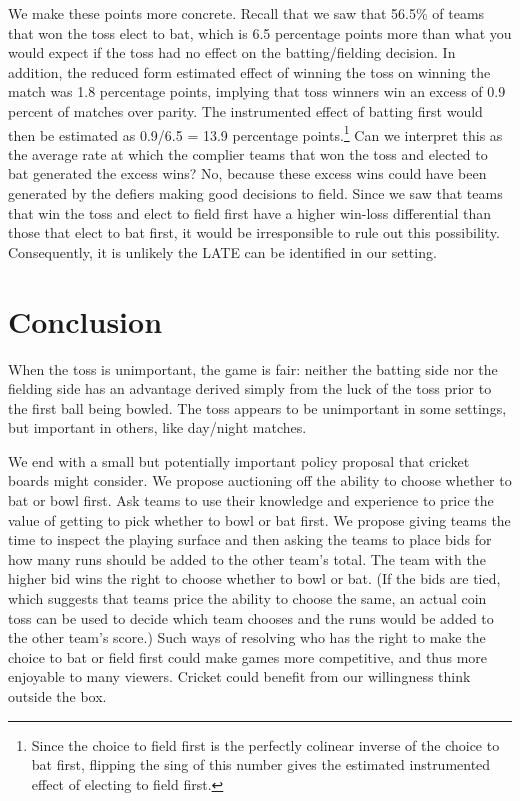 \documentclass[11pt,  letterpaper]{article}
\begin{document}
We make these points more concrete. Recall that we saw that 56.5\% of teams that won the toss elect to bat, which is 6.5 percentage points more than what you would expect if the toss had no effect on the batting/fielding decision. In addition, the reduced form estimated effect of winning the toss on winning the match was 1.8 percentage points, implying that toss winners win an excess of 0.9 percent of matches over parity. The instrumented effect of batting first would then be estimated as 0.9/6.5 = 13.9 percentage points.\footnote{Since the choice to field first is the perfectly colinear inverse of the choice to bat first, flipping the sing of this number gives the estimated instrumented effect of electing to field first.} Can we interpret this as the average rate at which the complier teams that won the toss and elected to bat generated the excess wins? No, because these excess wins could have been generated by the defiers making good decisions to field. Since we saw that teams that win the toss and elect to field first have a higher win-loss differential than those that elect to bat first, it would be irresponsible to rule out this possibility. Consequently, it is unlikely the LATE can be identified in our setting.

\section{Conclusion}

When the toss is unimportant, the game is fair: neither the batting side nor the fielding side has an advantage derived simply from the luck of the toss prior to the first ball being bowled. The toss appears to be unimportant in some settings, but important in others, like day/night matches. 

We end with a small but potentially important policy proposal that cricket boards might consider. We propose auctioning off the ability to choose whether to bat or bowl first. Ask teams to use their knowledge and experience to price the value of getting to pick whether to bowl or bat first. We propose giving teams the time to inspect the playing surface and then asking the teams to place bids for how many runs should be added to the other team's total. The team with the higher bid wins the right to choose whether to bowl or bat. (If the bids are tied, which suggests that teams price the ability to choose the same, an actual coin toss can be used to decide which team chooses and the runs would be added to the other team's score.) Such ways of resolving who has the right to make the choice to bat or field first could make games more competitive, and thus more enjoyable to many viewers. Cricket could benefit from our willingness think outside the box.
\end{document}
